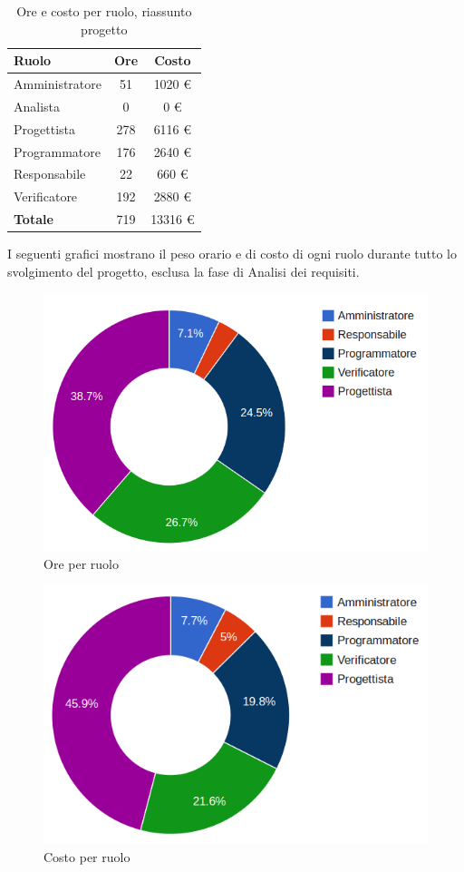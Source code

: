 \begin{table}[H]
	\centering
	\begin{tabular}{ l c c }
	\textbf{Ruolo} & \textbf{Ore} & \textbf{Costo} \\
	\hline
	Amministratore & 51 & 1020 €\\
	Analista & 0 & 0 €\\
	Progettista & 278 & 6116 €\\
	Programmatore & 176 & 2640 €\\
	Responsabile & 22 & 660 €\\
	Verificatore & 192 & 2880 €\\
	\hline
	\textbf{Totale} & 719 & 13316 €\\
	\hline
	\end{tabular}
	\caption{Ore e costo per ruolo, riassunto progetto}
	\end{table}

I seguenti grafici mostrano il peso orario e di costo di ogni ruolo durante tutto lo svolgimento del progetto, esclusa la fase di Analisi dei requisiti.

\begin{figure}[H]
\centering
\includegraphics[scale=0.35]{5-5-1.png}
\caption{Ore per ruolo\label{fig:nome}}
\end{figure}

\begin{figure}[H]
\centering
\includegraphics[scale=0.4]{5-5-2.png}
\caption{Costo per ruolo\label{fig:nome}}
\end{figure}